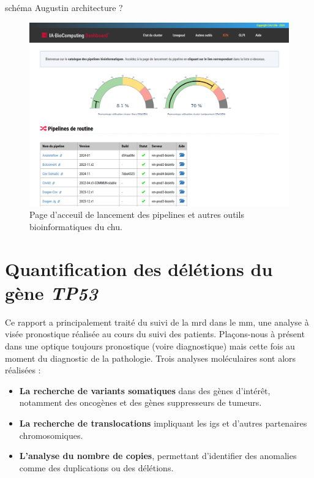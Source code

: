 schéma Augustin architecture ? 

\begin{figure}[H]
    \centering
    \includegraphics[width=1\textwidth]{images/dashboard_bioinfo.png}
    \caption{
        Page d'acceuil de lancement des pipelines et autres outils bioinformatiques du \gls{chu}.
    }
    \label{fig:bioinfo-dashboard}
\end{figure}

\section{Quantification des délétions du gène \textit{TP53}}

Ce rapport a principalement traité du suivi de la \gls{mrd} dans le \gls{mm}, une analyse à visée pronostique réalisée au cours du suivi des patients.
Plaçons-nous à présent dans une optique toujours pronostique (voire diagnostique) mais cette fois au moment du diagnostic de la pathologie. 
Trois analyses moléculaires sont alors réalisées :

\begin{itemize}
    \item \textbf{La recherche de variants somatiques} dans des gènes d'intérêt, notamment des oncogènes et des gènes suppresseurs de tumeurs.
    \item \textbf{La recherche de translocations} impliquant les \glspl{ig} et d'autres partenaires chromosomiques.
    \item \textbf{L'analyse du nombre de copies}, permettant d'identifier des anomalies comme des duplications ou des délétions.
\end{itemize}

